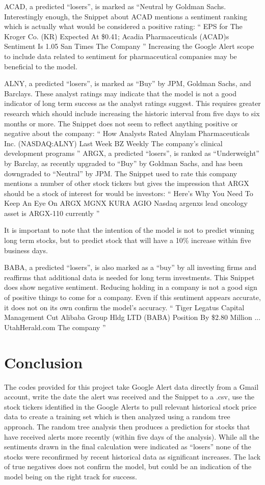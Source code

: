 \documentclass[sigconf]{acmart}
\begin{document}
ACAD, a predicted ``losers'', is marked as ``Neutral by Goldman Sachs. Interestingly enough, the Snippet about ACAD mentions a sentiment ranking which is actually what would be considered a positive rating:
``
EPS for The Kroger Co. (KR) Expected At \$0.41; Acadia Pharmaceuticals (ACAD)s Sentiment Is 1.05 San Times The Company
''
Increasing the Google Alert scope to include data related to sentiment for pharmaceutical companies may be beneficial to the model.

ALNY, a predicted ``losers'', is marked as ``Buy'' by JPM, Goldman Sachs, and Barclays. These analyst ratings may indicate that the model is not a good indicator of long term success as the analyst ratings suggest. This requires greater research which should include increasing the historic interval from five days to six months or more. The Snippet does not seem to reflect anything positive or negative about the company:
``
How Analysts Rated Alnylam Pharmaceuticals Inc. (NASDAQ:ALNY) Last Week BZ Weekly The company's clinical development programs
''
ARGX, a predicted ``losers'', is ranked as ``Underweight'' by Barclay, as recently upgraded to ``Buy'' by Goldman Sachs, and has been downgraded to ``Neutral'' by JPM. The Snippet used to rate this company mentions a number of other stock tickers but gives the impression that ARGX should be a stock of interest for would be investors:
``
Here's Why You Need To Keep An Eye On ARGX MGNX KURA AGIO Nasdaq argenxs lead oncology asset is ARGX-110 currently
''

 It is important to note that the intention of the model is not to predict winning long term stocks, but to predict stock that will have a 10\% increase within five business days.

BABA, a predicted ``losers'', is also marked as a ``buy'' by all investing firms and reaffirms that additional data is needed for long term investments. This Snippet does show negative sentiment. Reducing holding in a company is not a good sign of positive things to come for a company. Even if this sentiment appears accurate, it does not on its own confirm the model's accuracy.
``
Tiger Legatus Capital Management Cut Alibaba Group Hldg LTD (BABA) Position By \$2.80 Million ... UtahHerald.com The company
''



\section{Conclusion}
The codes provided for this project take Google Alert data directly from a Gmail account, write the date the alert was received and the Snippet to a .csv, use the stock tickers identified in the Google Alerts to pull relevant historical stock price data to create a training set which is then analyzed using a random tree approach. The random tree analysis then produces a prediction for stocks that have received alerts more recently (within five days of the analysis). While all the sentiments drawn in the final calculation were indicated as ``losers'' none of the stocks were reconfirmed by recent historical data as significant increases. The lack of true negatives does not confirm the model, but could be an indication of the model being on the right track for success.
\end{document}
